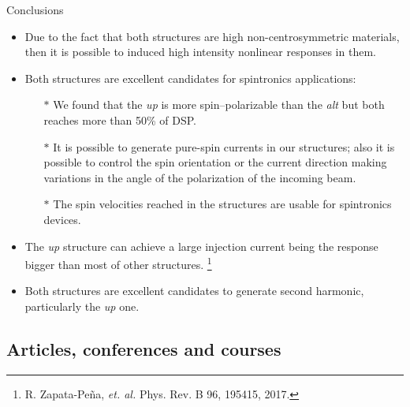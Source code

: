 \documentclass{beamer}
\begin{document}


\begin{frame}


{\Large Conclusions}
{\small

\begin{itemize}

\item 
Due to the fact that both structures are high non-centrosymmetric materials,
then it is possible to induced high intensity nonlinear responses in them.

\item 
Both structures are excellent candidates for spintronics applications:

\begin{itemize}
\item[$\boldsymbol{\ast}$] 
We found that the \emph{up} is more spin--polarizable than the \emph{alt} but
both reaches more than 50\% of DSP.

\item[$\boldsymbol{\ast}$] 
It is possible to generate pure-spin currents in our structures; also it is
possible to control the spin orientation or the current direction making
variations in the angle of the polarization of the incoming beam.

\item[$\boldsymbol{\ast}$] 
The spin velocities reached in the structures are usable for spintronics
devices.

\end{itemize}

\item 
The \emph{up} structure can achieve a large injection current being the
response bigger than most of other structures. \footnote[frame]{\tiny R.
Zapata-Pe\~na, \emph{et. al.} Phys. Rev. B 96, 195415, 2017.}

\item 
Both structures are excellent candidates to generate second harmonic,
particularly the \emph{up} one.


\end{itemize}
}

\end{frame}



\subsection{Articles, conferences and courses}
\end{document}
